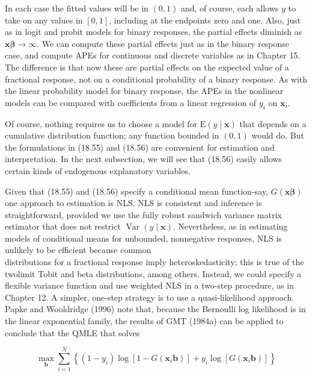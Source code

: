 \documentclass[10pt]{article}
\begin{document}
In each case the fitted values will be in $(0,1)$ and, of course, each allows $y$ to take on any values in $[0,1]$, including at the endpoints zero and one. Also, just as in logit and probit models for binary responses, the partial effects diminish as $\mathbf{x} \boldsymbol{\beta} \rightarrow \infty$. We can compute these partial effects just as in the binary response case, and compute APEs for continuous and discrete variables as in Chapter 15. The difference is that now these are partial effects on the expected value of a fractional response, not on a conditional probability of a binary response. As with the linear probability model for binary response, the APEs in the nonlinear models can be compared with coefficients from a linear regression of $y_{i}$ on $\mathbf{x}_{i}$.

Of course, nothing requires us to choose a model for $\mathrm{E}(y \mid \mathbf{x})$ that depends on a cumulative distribution function; any function bounded in $(0,1)$ would do. But the formulations in (18.55) and (18.56) are convenient for estimation and interpretation. In the next subsection, we will see that (18.56) easily allows certain kinds of endogenous explanatory variables.

Given that (18.55) and (18.56) specify a conditional mean function-say, $G(\mathbf{x} \boldsymbol{\beta})$ one approach to estimation is NLS. NLS is consistent and inference is straightforward, provided we use the fully robust sandwich variance matrix estimator that does not restrict $\operatorname{Var}(y \mid \mathbf{x})$. Nevertheless, as in estimating models of conditional means for unbounded, nonnegative responses, NLS is unlikely to be efficient because common\\
distributions for a fractional response imply heteroskedasticity; this is true of the twolimit Tobit and beta distributions, among others. Instead, we could specify a flexible variance function and use weighted NLS in a two-step procedure, as in Chapter 12. A simpler, one-step strategy is to use a quasi-likelihood approach. Papke and Wooldridge (1996) note that, because the Bernoulli log likelihood is in the linear exponential family, the results of GMT (1984a) can be applied to conclude that the QMLE that solves


\begin{equation*}
\max _{\mathbf{b}} \sum_{i=1}^{N}\left\{\left(1-y_{i}\right) \log \left[1-G\left(\mathbf{x}_{i} \mathbf{b}\right)\right]+y_{i} \log \left[G\left(\mathbf{x}_{i} \mathbf{b}\right)\right]\right\} \tag{18.57}
\end{equation*}
\end{document}
